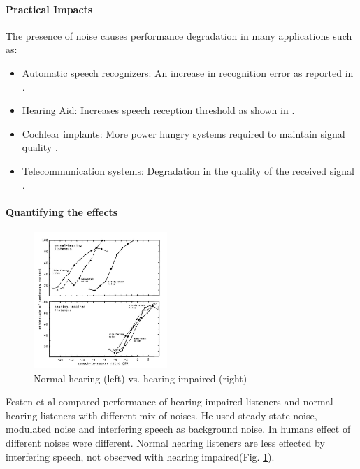 \documentclass[journal,  onecolumn, 12pt]{IEEEtran}
\begin{document}
\paragraph*{Practical Impacts} The presence of noise causes performance degradation in many applications such as:
\begin{itemize}
\item Automatic speech recognizers: An increase in recognition error as reported in \cite{Lippmann1997Speech,Juneja2012,Scharenborg2007}.
\item Hearing Aid: Increases speech reception threshold as shown in \cite{FestenAndPlomp1990,Kochkin2012}.
\item Cochlear implants: More power hungry systems required to maintain signal quality \cite{FriesenEtAl2001}.
\item Telecommunication systems: Degradation in the quality of the received signal \cite{Hecht2014,SmithAndPage2015}.
\end{itemize}

\paragraph*{Quantifying the effects}

\begin{figure}
\centering
\includegraphics[width=0.45\textwidth]{Cocktail.JPG}
\caption{Normal hearing (left) vs. hearing impaired (right)}
\label{fig:noise}
\end{figure}

Festen et al\cite{FestenAndPlomp1990} compared performance of hearing impaired listeners and normal hearing listeners with different mix of noises. He used steady state noise, modulated noise and interfering speech as background noise. In humans effect of different noises were different. Normal hearing listeners are less effected by interfering speech, not observed with hearing impaired(Fig. \ref{fig:noise}). 
\end{document}
